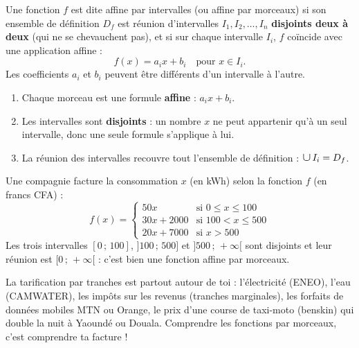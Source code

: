 \documentclass[11pt]{article}
\newcommand{\cle}[1]{{\popxbold\color{popdark}#1}}
\def\bigcup{\mathop{\mathchoice{\raisebox{-0.3em}{\scalebox{1.7}{$\cup$}}}{\scalebox{1.25}{$\cup$}}{\cup}{\cup}}\displaylimits}%
\begin{document}
\begin{definition}
Une fonction $f$ est dite \cle{affine par intervalles} (ou \cle{affine par morceaux}) si son ensemble de définition $D_f$ est réunion d'intervalles $I_1, I_2, \ldots, I_n$ \textbf{disjoints deux à deux} (qui ne se chevauchent pas), et si sur chaque intervalle $I_i$, $f$ coïncide avec une application affine :
\[ f(x) = a_i x + b_i \quad \text{pour } x \in I_i. \]
Les coefficients $a_i$ et $b_i$ peuvent être différents d'un intervalle à l'autre.
\end{definition}

\begin{aretenir}
\begin{enumerate}
\item Chaque morceau est une formule \textbf{affine} : $a_i x + b_i$.
\item Les intervalles sont \textbf{disjoints} : un nombre $x$ ne peut appartenir qu'à un seul intervalle, donc une seule formule s'applique à lui.
\item La réunion des intervalles recouvre tout l'ensemble de définition : $\bigcup I_i = D_f$.
\end{enumerate}
\end{aretenir}

\begin{exemplebox}
Une compagnie facture la consommation $x$ (en kWh) selon la fonction $f$ (en francs CFA) :
\[
f(x) = \begin{cases}
50x & \text{si } 0 \leq x \leq 100 \\
30x + 2000 & \text{si } 100 < x \leq 500 \\
20x + 7000 & \text{si } x > 500
\end{cases}
\]
Les trois intervalles $[0\,;\,100]$, $]100\,;\,500]$ et $]500\,;\,+\infty[$ sont disjoints et leur réunion est $[0\,;\,+\infty[$ : c'est bien une fonction affine par morceaux.
\end{exemplebox}

\begin{savaistu}
La tarification par tranches est partout autour de toi : l'électricité (ENEO), l'eau (CAMWATER), les impôts sur les revenus (tranches marginales), les forfaits de données mobiles MTN ou Orange, le prix d'une course de taxi-moto (\og benskin\fg{}) qui double la nuit à Yaoundé ou Douala. Comprendre les fonctions par morceaux, c'est comprendre ta facture !
\end{savaistu}
\end{document}
